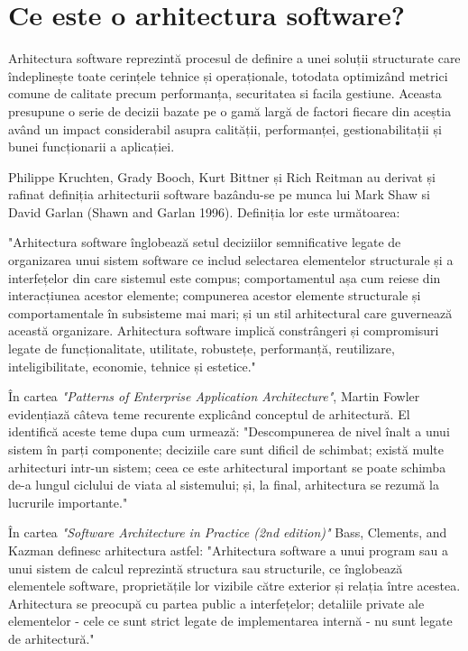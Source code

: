 \documentclass[12pt, a4paper, oneside, romanian]{teza-upb}
\begin{document}
\section{Ce este o arhitectura software?}
Arhitectura software reprezintă procesul de definire a unei soluții structurate care îndeplinește toate cerințele tehnice și operaționale, totodata optimizând metrici comune de calitate precum performanța, securitatea si facila gestiune. Aceasta presupune o serie de decizii bazate pe o gamă largă de factori fiecare din aceștia având un impact considerabil asupra calității, performanței, gestionabilitații și bunei funcționarii a aplicației.

Philippe Kruchten, Grady Booch, Kurt Bittner și Rich Reitman au derivat și rafinat definiția arhitecturii software bazându-se pe munca lui Mark Shaw si David Garlan (Shawn and Garlan 1996). Definiția lor este următoarea:

"Arhitectura software înglobează setul deciziilor semnificative legate de organizarea unui sistem software ce includ selectarea elementelor structurale și a interfețelor din care sistemul este compus; comportamentul așa cum reiese din interacțiunea acestor elemente; compunerea acestor elemente structurale și comportamentale în subsisteme mai mari; și un stil arhitectural care guvernează această organizare. Arhitectura software implică constrângeri și compromisuri legate de funcționalitate, utilitate, robustețe, performanță, reutilizare, inteligibilitate, economie, tehnice și estetice."

În cartea \emph{"Patterns of Enterprise Application Architecture"}, Martin Fowler evidențiază câteva teme recurente explicând conceptul de arhitectură. El identifică aceste teme dupa cum urmează: "Descompunerea de nivel înalt a unui sistem în parți componente; deciziile care sunt dificil de schimbat; există multe arhitecturi intr-un sistem; ceea ce este arhitectural important se poate schimba de-a lungul ciclului de viata al sistemului; și, la final, arhitectura se rezumă la lucrurile importante."

În cartea \emph{"Software Architecture in Practice (2nd edition)"} Bass, Clements, and Kazman definesc arhitectura astfel: "Arhitectura software a unui program sau a unui sistem de calcul reprezintă structura sau structurile, ce înglobează elementele software, proprietățile lor vizibile către exterior și relația între acestea. Arhitectura se preocupă cu partea public a interfețelor; detaliile private ale elementelor - cele ce sunt strict legate de implementarea internă - nu sunt legate de arhitectură."
\end{document}
